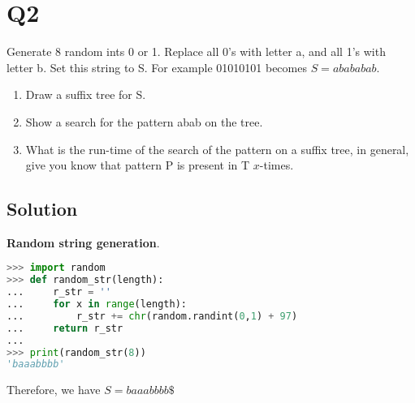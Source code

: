 
\section*{Q2}

Generate 8 random ints 0 or 1.
Replace all 0's with letter a, and all 1's with letter b.
Set this string to S.
For example 01010101 becomes $S=abababab$.

\begin{enumerate}
    \item Draw a suffix tree for S.
    \item Show a search for the pattern abab on the tree.
    \item What is the run-time of the search of the pattern on a suffix tree, in general, give you know that pattern P is present in T $x$-times.
\end{enumerate}

\subsection*{Solution}

\textbf{Random string generation}.
\begin{lstlisting}[language=python]
>>> import random
>>> def random_str(length):
...     r_str = ''
...     for x in range(length):
...         r_str += chr(random.randint(0,1) + 97)
...     return r_str
...
>>> print(random_str(8))
'baaabbbb'
\end{lstlisting}

Therefore, we have $S = baaabbbb\$$

